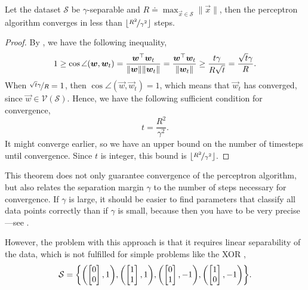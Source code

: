 \begin{theorem}
    Let the dataset $\mathcal{S}$ be $\gamma$-separable and $R \doteq \max_{\vec{x} \in \mathcal{S}} \| \vec{x} \|$,
    then the perceptron algorithm converges in less than $\lfloor\nicefrac{R^2}{\gamma^2}\rfloor$ steps.
\end{theorem}

\begin{proof}
    By , we have the following inequality, \[
        1 \geq \cos \angle{(\bm{w}, \bm{w}_t)} = \frac{\bm{w}^\top \bm{w}_t}{\| \bm{w} \| \| \bm{w}_t \|} = \frac{\bm{w}^\top\bm{w}_t}{\| \bm{w}_t \|} \geq \frac{t \gamma}{R \sqrt{t}} = \frac{\sqrt{t} \gamma}{R}.
    \]
    When $\nicefrac{\sqrt{t} \gamma}{R} = 1$, then $\cos \angle{(\vec{w}, \vec{w}_t)} = 1$, which means
    that $\vec{w}_t$ has converged, since $\vec{w} \in \mathcal{V}(\mathcal{S})$. Hence, we have the
    following sufficient condition for convergence, \[
        t = \frac{R^2}{\gamma^2}.
    \]
    It might converge earlier, so we have an upper bound on the number of timesteps until convergence.
    Since $t$ is integer, this bound is $\lfloor\nicefrac{R^2}{\gamma^2}\rfloor$.
\end{proof}

This theorem does not only guarantee convergence of the perceptron algorithm, but also relates the
separation margin $\gamma$ to the number of steps necessary for convergence. If $\gamma$ is large,
it should be easier to find parameters that classify all data points correctly than if $\gamma$ is
small, because then you have to be very precise---see .

However, the problem with this approach is that it requires linear separability of the data, which
is not fulfilled for simple problems like the XOR \citep{minsky1969introduction}, \[
    \mathcal{S} = \lft\{ \lft( \begin{bmatrix} 0 \\ 0 \end{bmatrix},1 \rgt), \lft( \begin{bmatrix} 1 \\ 1 \end{bmatrix},1 \rgt), \lft( \begin{bmatrix} 0 \\ 1 \end{bmatrix},-1 \rgt), \lft( \begin{bmatrix} 1 \\ 0 \end{bmatrix},-1 \rgt) \rgt\}.
\]

